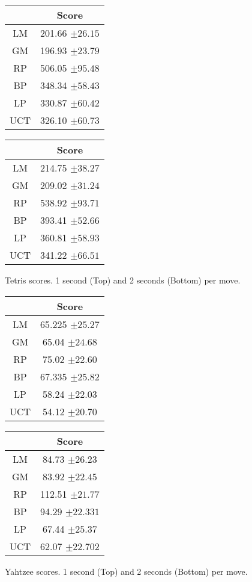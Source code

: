 \documentclass[double,12pt]{beavtex}
\begin{document}
\begin{figure}
\centering
\begin{tabular}{|c|c|} 
 \hline
  & Score \\
 \hline
 LM & 201.66 $\pm 26.15$ \\
 \hline
 GM & 196.93 $\pm 23.79$ \\
 \hline
 RP & 506.05 $\pm 95.48$ \\
 \hline
 BP & 348.34 $\pm 58.43$ \\
 \hline
 LP & 330.87 $\pm 60.42$ \\
 \hline
 UCT & 326.10 $\pm 60.73$ \\
 \hline
\end{tabular}
\linebreak
\linebreak
\linebreak
\begin{tabular}{|c|c|} 
 \hline
  & Score \\
 \hline
 LM & 214.75 $\pm 38.27$ \\
 \hline
 GM & 209.02 $\pm 31.24$ \\
 \hline
 RP & 538.92 $\pm 93.71$ \\
 \hline
 BP & 393.41 $\pm 52.66$ \\
 \hline
 LP & 360.81 $\pm 58.93$ \\
 \hline
 UCT & 341.22 $\pm 66.51$ \\
 \hline
\end{tabular}
\caption{Tetris scores. 1 second (Top) and 2 seconds (Bottom) per move.}
\end{figure}

\begin{figure}
\centering
\begin{tabular}{|c|c|} 
 \hline
  & Score \\
 \hline
 LM & 65.225 $\pm 25.27$ \\
 \hline
 GM & 65.04 $\pm 24.68$ \\
 \hline
 RP & 75.02 $\pm 22.60$ \\
 \hline
 BP & 67.335 $\pm 25.82$ \\
 \hline
 LP & 58.24 $\pm 22.03$ \\
 \hline
 UCT & 54.12 $\pm 20.70$ \\
 \hline
\end{tabular}
\linebreak
\linebreak
\linebreak
\begin{tabular}{|c|c|} 
 \hline
  & Score \\
 \hline
 LM & 84.73 $\pm 26.23$ \\
 \hline
 GM & 83.92 $\pm 22.45$ \\
 \hline
 RP & 112.51 $\pm 21.77$ \\
 \hline
 BP & 94.29 $\pm 22.331$ \\
 \hline
 LP & 67.44 $\pm 25.37$ \\
 \hline
 UCT & 62.07 $\pm 22.702$ \\
 \hline
\end{tabular}
\caption{Yahtzee scores. 1 second (Top) and 2 seconds (Bottom) per move.}
\end{figure}
\end{document}
